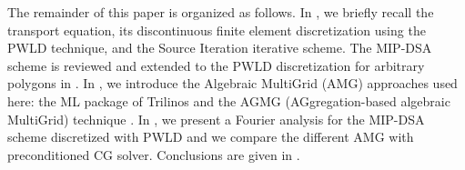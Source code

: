 The remainder of this paper is organized as follows. In ,
we briefly recall the \sn transport equation, its discontinuous finite element
discretization using the PWLD technique, and the Source Iteration iterative scheme. 
The MIP-DSA scheme is reviewed and extended to the PWLD discretization for arbitrary 
polygons in . In , we introduce the Algebraic MultiGrid (AMG) 
approaches used here: the ML package of Trilinos \cite{ml_guide} and the
AGMG (AGgregation-based algebraic MultiGrid) technique
\cite{agmg_guide,agmg,agmg2,agmg3}. In
, we present a Fourier analysis for the MIP-DSA scheme discretized with
PWLD and we compare the different AMG with preconditioned CG solver.
Conclusions are given in .

